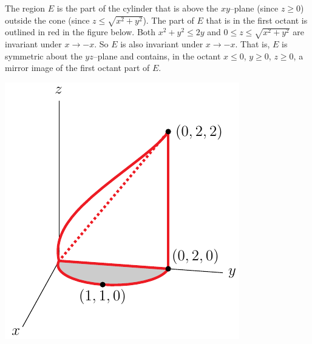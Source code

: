 \begin{solution}
The region $E$ is the part of the cylinder that is above the
$xy$--plane (since $z\ge 0$) outside the cone (since $z\le\sqrt{x^2+y^2}$).
The part of $E$ that is in the first octant is outlined in red in the
figure below. Both $x^2 + y^2 \le 2y$ and $0 \le z \le \sqrt{x^2 + y^2}$
are invariant under $x\rightarrow -x$. So $E$ is also invariant
under $x\rightarrow -x$. That is, $E$ is symmetric about the $yz$--plane
and contains, in the octant $x\le 0$, $y\ge 0$, $z\ge 0$, a mirror
image of the first octant part of $E$.

\begin{center}
     \includegraphics{fig/OE05D_8.pdf}
\end{center}


\end{solution}
